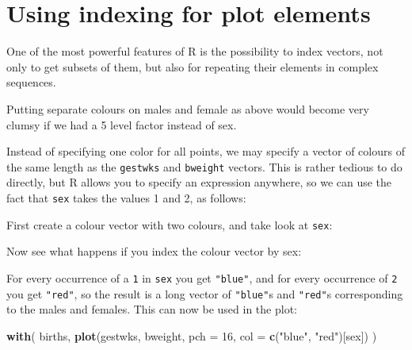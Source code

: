 \documentclass[
]{book}
\newenvironment{Shaded}{\begin{snugshade}}{\end{snugshade}}
\newcommand{\AttributeTok}[1]{\textcolor[rgb]{0.13,0.29,0.53}{#1}}
\newcommand{\DecValTok}[1]{\textcolor[rgb]{0.00,0.00,0.81}{#1}}
\newcommand{\FunctionTok}[1]{\textcolor[rgb]{0.13,0.29,0.53}{\textbf{#1}}}
\newcommand{\NormalTok}[1]{#1}
\newcommand{\SpecialCharTok}[1]{\textcolor[rgb]{0.81,0.36,0.00}{\textbf{#1}}}
\newcommand{\StringTok}[1]{\textcolor[rgb]{0.31,0.60,0.02}{#1}}
\begin{document}
\section{Using indexing for plot elements}\label{using-indexing-for-plot-elements}

One of the most powerful features of R is the possibility to index
vectors, not only to get subsets of them, but also for repeating their
elements in complex sequences.

Putting separate colours on males and female as above would become
very clumsy if we had a 5 level factor instead of sex.

Instead of specifying one color for all points, we may specify a
vector of colours of the same length as the \texttt{gestwks} and
\texttt{bweight} vectors. This is rather tedious to do directly, but R
allows you to specify an expression anywhere, so we can use the fact
that \texttt{sex} takes the values 1 and 2, as follows:

First create a colour vector with two colours,
and take look at \texttt{sex}:

\begin{Shaded}
\end{Shaded}

Now see what happens if you index the colour vector by sex:

\begin{Shaded}
\end{Shaded}

For every occurrence of a \texttt{1} in \texttt{sex} you get
\texttt{"blue"}, and for every occurrence of \texttt{2} you get
\texttt{"red"}, so the result is a long vector of \texttt{"blue"}s and
\texttt{"red"}s corresponding to the males and females.
This can now be used in the plot:

\begin{Shaded}
\begin{Highlighting}[]
\FunctionTok{with}\NormalTok{(}
\NormalTok{  births, }
  \FunctionTok{plot}\NormalTok{(gestwks, bweight, }\AttributeTok{pch =} \DecValTok{16}\NormalTok{, }\AttributeTok{col =} \FunctionTok{c}\NormalTok{(}\StringTok{"blue"}\NormalTok{, }\StringTok{"red"}\NormalTok{)[sex])}
\NormalTok{)}
\end{Highlighting}
\end{Shaded}
\end{document}
